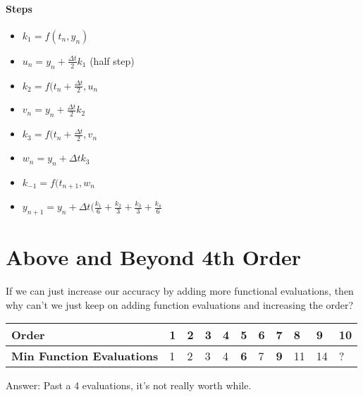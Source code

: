 \documentclass[a4paper,12pt]{report}
\begin{document}
\paragraph{Steps}
\begin{itemize}
\item $k_1 = f(t_n, y_n)$
\item $u_n = y_n + \frac{\Delta t}{2} k_1$ (half step)
\item $k_2 = f(t_n + \frac{\Delta t}{2}, u_n$
\item $v_n = y_n + \frac{\Delta t}{2} k_2$
\item $k_3 = f(t_n+\frac{\Delta t}{2}, v_n$
\item $w_n = y_n + \Delta t k_3$
\item $k_{-1} = f(t_{n+1}, w_n$
\item $y_{n+1} = y_n + \Delta t(\frac{k_1}{6}+\frac{k_2}{3}+\frac{k_3}{3}+\frac{k_4}{6}$
\end{itemize}

\section{Above and Beyond 4th Order}
If we can just increase our accuracy by adding more functional evaluations, then why can't we just keep on 
adding function evaluations and increasing the order?

\begin{tabular}{l|llllllllll}
\textbf{Order} & 1 & 2 & 3 & 4 & 5 & 6 & 7 & 8 & 9 & 10 \\
\hline
\textbf{Min Function Evaluations} & 1 & 2 & 3 & 4 & \textbf{6} & 7 & \textbf{9} & 11 & 14 & ? \\
\end{tabular}

Answer: Past a 4 evaluations, it's not really worth while.
\end{document}
